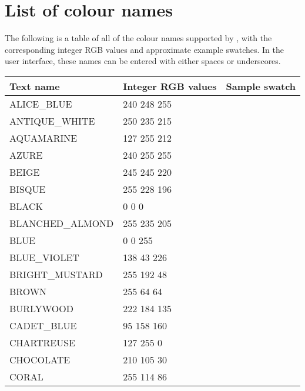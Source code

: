 \newpage
\section{List of colour names}

The following is a table of all of the colour names supported by
\display{}, with the corresponding integer RGB values and approximate example
swatches. In the user interface, these names can be entered with either
spaces or underscores.

\begin{longtable}{l|l|l}
{\bf Text name} & {\bf Integer RGB values} & {\bf Sample swatch}\\
\hline
ALICE\_BLUE & 240 248 255 & \colorbox[RGB]{240 248 255}{\phantom{MMMMMMMM}}\\
ANTIQUE\_WHITE & 250 235 215 & \colorbox[RGB]{250 235 215}{\phantom{MMMMMMMM}}\\
AQUAMARINE & 127 255 212 & \colorbox[RGB]{127 255 212}{\phantom{MMMMMMMM}}\\
AZURE & 240 255 255 & \colorbox[RGB]{240 255 255}{\phantom{MMMMMMMM}}\\
BEIGE & 245 245 220 & \colorbox[RGB]{245 245 220}{\phantom{MMMMMMMM}}\\
BISQUE & 255 228 196 & \colorbox[RGB]{255 228 196}{\phantom{MMMMMMMM}}\\
BLACK & 0 0 0 & \colorbox[RGB]{0 0 0}{\phantom{MMMMMMMM}}\\
BLANCHED\_ALMOND & 255 235 205 & \colorbox[RGB]{255 235 205}{\phantom{MMMMMMMM}}\\
BLUE & 0 0 255 & \colorbox[RGB]{0 0 255}{\phantom{MMMMMMMM}}\\
BLUE\_VIOLET & 138 43 226 & \colorbox[RGB]{138 43 226}{\phantom{MMMMMMMM}}\\
BRIGHT\_MUSTARD & 255 192 48 & \colorbox[RGB]{255 192 48}{\phantom{MMMMMMMM}}\\
BROWN & 255 64 64 & \colorbox[RGB]{255 64 64}{\phantom{MMMMMMMM}}\\
BURLYWOOD & 222 184 135 & \colorbox[RGB]{222 184 135}{\phantom{MMMMMMMM}}\\
CADET\_BLUE & 95 158 160 & \colorbox[RGB]{95 158 160}{\phantom{MMMMMMMM}}\\
CHARTREUSE & 127 255 0 & \colorbox[RGB]{127 255 0}{\phantom{MMMMMMMM}}\\
CHOCOLATE & 210 105 30 & \colorbox[RGB]{210 105 30}{\phantom{MMMMMMMM}}\\
CORAL & 255 114 86 & \colorbox[RGB]{255 114 86}{\phantom{MMMMMMMM}}\\

\end{longtable}
